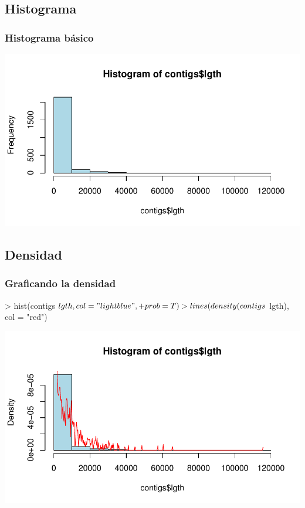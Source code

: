\subsection{Histograma}

\begin{frame}
  \frametitle{Histograma básico}
\begin{Schunk}
\end{Schunk}
\includegraphics{plots/figura-027}
\end{frame}

\subsection{Densidad}

\begin{frame}
  \frametitle{Graficando la densidad}
\begin{Schunk}
\begin{Sinput}
> hist(contigs$lgth, col = "lightblue", 
+     prob = T)
> lines(density(contigs$lgth), col = "red")
\end{Sinput}
\end{Schunk}
\includegraphics{plots/figura-028}
\end{frame}

